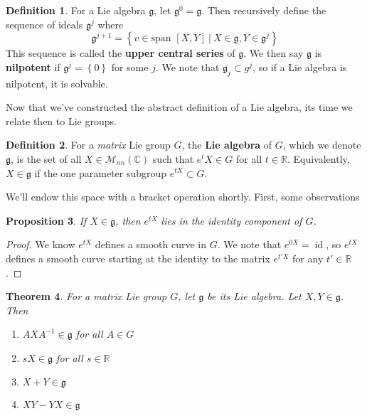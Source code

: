 \documentclass[psamsfonts]{amsart}
\newtheorem{thm}{Theorem}[section]
\newtheorem{prop}[thm]{Proposition}
\theoremstyle{definition}
\newtheorem{defn}[thm]{Definition}
\theoremstyle{remark}
\newcommand{\R}{\mathbb{R}}
\newcommand{\C}{\mathbb{C}}
\newcommand{\M}{\mathcal{M}}
\newcommand{\g}{\mathfrak{g}}
\newcommand{\inv}{^{-1}}
\newcommand{\bra}[2]{ \left[ #1, #2 \right] }
\newcommand{\set}[1]{\left\lbrace#1 \right\rbrace}
\DeclareMathOperator{\id}{id}
\begin{document}
\begin{defn}
For a Lie algebra $\g$, let $\g^0 = \g$. Then recursively define the sequence of ideals $\g^j$ where 
$$\g^{j+1} =  \set{v \in \text{span } \bra{X}{Y}~|~ X \in \g, Y \in \g^j}$$
This sequence is called the \textbf{upper central series} of $\g$. We then say $\g$ is \textbf{nilpotent} if $\g^j = \set{0}$ for some $j$. We note that $\g_j \subset g^j$, so if a Lie algebra is nilpotent, it is solvable.
\end{defn}

Now that we've constructed the abstract definition of a Lie algebra, its time we relate then to Lie groups.

\begin{defn}
For a \emph{matrix} Lie group $G$, the \textbf{Lie algebra} of $G$, which we denote $\g$, is the set of all $X \in \M_{nn}(\C)$ such that $e^tX \in G$ for all $t \in \R$. Equivalently, $X \in \g$ if the one parameter subgroup $e^{tX} \subset G$.
\end{defn}

We'll endow this space with a bracket operation shortly. First, some observations

\begin{prop}
If $X \in \g$, then $e^{tX}$ lies in the identity component of $G$.
\end{prop}

\begin{proof}
We know $e^{tX}$ defines a smooth curve in $G$. We note that $e^{0X} = \id$, so $e^{tX}$ defines a smooth curve starting at the identity to the matrix $e^{t'X}$ for any $t' \in \R$. 
\end{proof}

\begin{thm}
For a matrix Lie group $G$, let $\g$ be its Lie algebra. Let $X,Y \in \g$. Then
\begin{enumerate}
\item $AXA\inv \in \g$ for all $A \in G$
\item $sX \in \g$ for all $s \in \R$
\item $X + Y \in \g$
\item $XY-YX \in \g$
\end{enumerate}
\end{thm}
\end{document}
